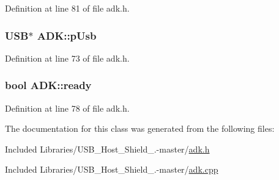 \-Definition at line 81 of file adk.\-h.

\hypertarget{class_a_d_k_ab28e3a19569c27f3ed5362e9800065c1}{
\subsubsection[{p\-Usb}]{\setlength{\rightskip}{0pt plus 5cm}\-U\-S\-B$\ast$ {\bf \-A\-D\-K\-::p\-Usb}}}\label{class_a_d_k_ab28e3a19569c27f3ed5362e9800065c1}


\-Definition at line 73 of file adk.\-h.

\hypertarget{class_a_d_k_a135db75b9e8cdd59b89f46c44dd83dd4}{
\subsubsection[{ready}]{\setlength{\rightskip}{0pt plus 5cm}bool {\bf \-A\-D\-K\-::ready}}}\label{class_a_d_k_a135db75b9e8cdd59b89f46c44dd83dd4}


\-Definition at line 78 of file adk.\-h.



\-The documentation for this class was generated from the following files\-:\begin{DoxyCompactItemize}
\item 
\-Included Libraries/\-U\-S\-B\-\_\-\-Host\-\_\-\-Shield\-\_.-\/master/\hyperlink{adk_8h}{adk.\-h}\item 
\-Included Libraries/\-U\-S\-B\-\_\-\-Host\-\_\-\-Shield\-\_.-\/master/\hyperlink{adk_8cpp}{adk.\-cpp}\end{DoxyCompactItemize}
